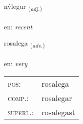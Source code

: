 \documentclass[frontgrid, backgrid]{flacards}\usepackage[]{graphicx}\usepackage[]{color}
\begin{document}
\renewcommand{\flhead}{\vskip5pt \fboxsep=0pt {\small\bfseries\footnotesize Lýsingarorð | Adjective}}
\renewcommand{\fcfoot}{\vskip5pt \fboxsep=0pt \hspace{2pt}{\small\bfseries\footnotesize 2K}}

\renewcommand{\blhead}{\vskip5pt {\small\bfseries\footnotesize Lýsingarorð | Adjective }}
\renewcommand{\bcfoot}{\vskip5pt \hspace{2pt}{\small\bfseries\footnotesize 2K}}


{nýlegur \small{\textsubscript{(\textit{adj.})}} \\[1ex] %
\textphonetic{[niːlɛɣʏr]} \\
en: \emph{recent} \\  [2ex]
\renewcommand*{\arraystretch}{0.8}
}

\renewcommand{\flhead}{\vskip5pt \fboxsep=0pt {\small\bfseries\footnotesize Atviksorð | Adverb}}
\renewcommand{\fcfoot}{\vskip5pt \fboxsep=0pt \hspace{2pt}{\small\bfseries\footnotesize 2K}}

\renewcommand{\blhead}{\vskip5pt {\small\bfseries\footnotesize Atviksorð | Adverb }}
\renewcommand{\bcfoot}{\vskip5pt \hspace{2pt}{\small\bfseries\footnotesize 2K}}


{rosalega \small{\textsubscript{(\textit{adv.})}} \\[1ex] %
\textphonetic{[rɔːsalɛɣa]} \\
en: \emph{very} \\  [2ex]
\renewcommand*{\arraystretch}{0.8}
\begin{tabular}{ll}
\textsc{pos}: & rosalega \\ 
\textsc{comp.}: & rosalegar \\ 
\textsc{superl.}: & rosalegast \\
\end{tabular}
}
\end{document}
